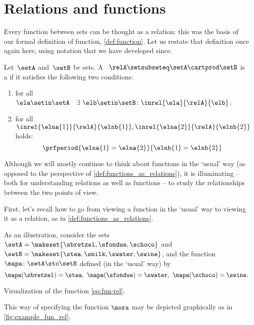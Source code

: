 
\section{Relations and functions}

Every function between sets can be thought as a relation: this was the basis of our formal definition of function, \cref{def:function}.
Let us restate that definition once again here, using notation that we have developed since.

\begin{ctdefinition}
    \label{def:functions_as_relations}
    Let~$\setA$ and~$\setB$ be sets.
    A ~$\relA \setsubseteq \setA \cartprod \setB$ is a \emph{} if it satisfies the following two conditions:
    \begin{enumerate}
        \item for all~$\ela \setin \setA \quad \exists \ \elb \setin \setB\colon  \inrel{\ela}{\relA}{\elb}$;
        \item for all~$\inrel{\elna{1}}{\relA}{\elnb{1}}, \inrel{\elna{2}}{\relA}{\elnb{2}}$ holds:
              \begin{equation*}
                  \prfperiod{\elna{1} = \elna{2}}{\elnb{1} = \elnb{2}}
              \end{equation*}
    \end{enumerate}
\end{ctdefinition}

Although we will mostly continue to think about functions in the `usual' way (as opposed to the perspective of \cref{def:functions_as_relations}), it is illuminating -- both for understanding relations as well as functions -- to study the relationships between the two points of view.

First, let's recall how to go from viewing a function in the `usual' way to viewing it as a relation, as in \cref{def:functions_as_relations}.

As an illustration, consider the sets~$\setA = \makeset{ \sbretzel, \sfondue, \schoco }$ and~$\setB = \makeset{ \stea, \smilk, \swater, \swine }$, and the function~$\mapa \colon \setA \sto \setB$ defined (in the `usual' way) by
\begin{equation*}
    \mapa (\sbretzel) = \stea, \ \mapa (\sfondue) = \swater, \ \mapa(\schoco) = \swine.
\end{equation*}
\begin{marginfigure}
    \centering
    \caption{Visualization of the function \cref{eq:fun-rel}.}
    \label{fig:example_fun_rel}
\end{marginfigure}
This way of specifying the function $\mora$ may be depicted graphically as in \cref{fig:example_fun_rel}.

